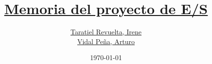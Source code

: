 \documentclass[11pt]{article}
\title{\underline{\textbf{Memoria del proyecto de E/S}}}
\author{\authors\underline{Taratiel Revuelta, Irene} \\
	\authors\underline{Vidal Peña, Arturo}}
\date{\today}
\begin{document}
	
	\maketitle
	
	\tableofcontents
	
	\clearpage\mbox{}\clearpage
\end{document}

